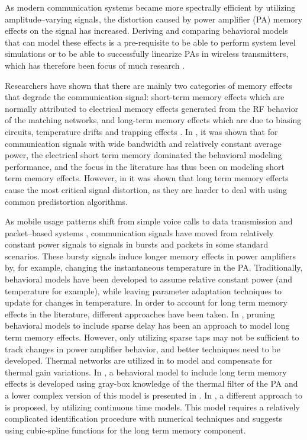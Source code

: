 \documentclass[journal]{IEEEtran}
\begin{document}
As modern communication systems became more spectrally efficient by utilizing amplitude--varying signals, the distortion caused by power amplifier (PA) memory effects on the signal has increased. Deriving and comparing behavioral models that can model these effects is a pre-requisite to be able to perform system level simulations or to be able to successfully linearize PAs in wireless transmitters, which has therefore been focus of much research \cite{pedro, soltani, isaksson}.

Researchers have shown that there are mainly two categories of memory effects that degrade the communication signal: short-term memory effects which are normally attributed to electrical memory effects generated from the RF behavior of the matching networks, and long-term memory effects which are due to biasing circuits, temperature drifts and trapping effects \cite{vuolevi,ngoya,ku2003}. In \cite{thermal_boumaiza}, it was shown that for communication signals with wide bandwidth and relatively constant average power, the electrical short term memory dominated the behavioral modeling performance, and the focus in the literature has thus been on modeling short term memory effects. However, in \cite{bosch} it was shown that long term memory effects cause the most critical signal distortion, as they are harder to deal with using common predistortion algorithms.

As mobile usage patterns shift from simple voice calls to data transmission and packet--based systems \cite{coda}, communication signals have moved from relatively constant power signals to signals in bursts and packets in some standard scenarios. These bursty signals induce longer memory effects in power amplifiers by, for example, changing the instantaneous temperature in the PA. Traditionally, behavioral models have been developed to assume relative constant power (and temperature for example), while leaving parameter adaptation techniques to update for changes in temperature. In order to account for long term memory effects in the literature, different approaches have been taken. In 
\cite{ku2003}, pruning behavioral models to include sparse delay has been an approach to model long term memory effects. However, only utilizing sparse taps may not be sufficient to track changes in power amplifier behavior, and better techniques need to be developed. Thermal networks are utilized in \cite{thermal_boumaiza,thermal_mazeau} to model and compensate for thermal gain variations. In \cite{crespo2010}, a  behavioral model to include long term memory effects is developed using gray-box knowledge of the thermal filter of the PA and a lower complex version of this model is presented in \cite{crespo2011}. In \cite{ngoya}, a different approach to is proposed, by utilizing continuous time models. This model requires a relatively complicated identification procedure with numerical techniques and suggests using cubic-spline functions for the long term memory component.
\end{document}
